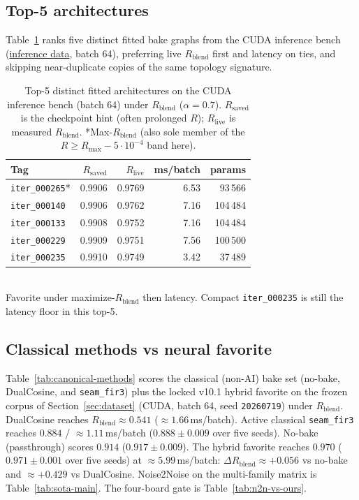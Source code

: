 \subsection{Top-5 architectures}
\label{sec:top5-arch}
Table~\ref{tab:top5} ranks five distinct fitted bake graphs from the CUDA inference bench
(\href{https://github.com/reeldemo/denoise-opt-meta/blob/master/paper/Unsupervised_Wavetable_Seam_Artifact_Repair_via_Hybrid_GA-PPO_Meta-Search_v11/figures/inference_bench.json}{inference data}, batch 64), preferring live $R_{\mathrm{blend}}$ first and latency on ties,
and skipping near-duplicate copies of the same topology signature.

\begin{table}[t]
  \centering
  \caption{Top-5 distinct fitted architectures on the CUDA inference bench (batch 64) under $R_{\mathrm{blend}}$ ($\alpha{=}0.7$).
  $R_{\mathrm{saved}}$ is the checkpoint hint (often prolonged $R$); $R_{\mathrm{live}}$ is measured $R_{\mathrm{blend}}$.
  *Max-$R_{\mathrm{blend}}$ (also sole member of the $R\ge R_{\max}-5\cdot10^{-4}$ band here).}
  \label{tab:top5}
  \setlength{\tabcolsep}{3pt}
  \begin{tabular}{@{}lrrrr@{}}
    \toprule
    Tag & $R_{\mathrm{saved}}$ & $R_{\mathrm{live}}$ & ms/batch & params \\
    \midrule
    \texttt{iter\_000265}* & 0.9906 & 0.9769 & 6.53 & 93\,566 \\
    \texttt{iter\_000140} & 0.9906 & 0.9762 & 7.16 & 104\,484 \\
    \texttt{iter\_000133} & 0.9908 & 0.9752 & 7.16 & 104\,484 \\
    \texttt{iter\_000229} & 0.9909 & 0.9751 & 7.56 & 100\,500 \\
    \texttt{iter\_000235} & 0.9910 & 0.9749 & 3.42 & 37\,489 \\
    \bottomrule
  \end{tabular}\\[0.4em]
  {\footnotesize *Favorite under maximize-$R_{\mathrm{blend}}$ then latency. Compact \texttt{iter\_000235} is still the latency floor in this top-5.}
\end{table}

\subsection{Classical methods vs neural favorite}
\label{sec:classical-vs-favorite}
Table~\ref{tab:canonical-methods} scores the classical (non-AI) bake set (no-bake, DualCosine, and \texttt{seam\_fir3}) plus the locked v10.1 hybrid favorite on the frozen corpus of Section~\ref{sec:dataset} (CUDA, batch 64, seed \texttt{20260719}) under $R_{\mathrm{blend}}$.
DualCosine reaches $R_{\mathrm{blend}}\approx 0.541$ ($\approx 1.66$\,ms/batch).
Active classical \texttt{seam\_fir3} reaches $0.884$ / $\approx 1.11$\,ms/batch ($0.888\pm0.009$ over five seeds).
No-bake (passthrough) scores $0.914$ ($0.917\pm0.009$).
The hybrid favorite reaches $0.970$ ($0.971\pm0.001$ over five seeds) at $\approx 5.99$\,ms/batch:
$\Delta R_{\mathrm{blend}} \approx {+}0.056$ vs no-bake and $\approx {+}0.429$ vs DualCosine.
Noise2Noise on the multi-family matrix is Table~\ref{tab:sota-main}. The four-board gate is Table~\ref{tab:n2n-vs-ours}.

